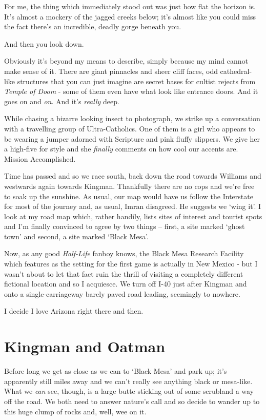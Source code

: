 \documentclass[a5paper,10pt,titlepage,draft]{book}
\begin{document}
For me, the thing which immediately stood out was just how flat the horizon is.  It's almost a mockery of the jagged creeks below; it's almost like you could miss the fact there's an incredible, deadly gorge beneath you.

And then you look down.

Obviously it's beyond my means to describe, simply because my mind cannot make sense of it.  There are giant pinnacles and sheer cliff faces, odd cathedral-like structures that you can just imagine are secret bases for cultist rejects from \emph{Temple of Doom} - some of them even have what look like entrance doors.  And it goes on and \emph{on}.  And it's \emph{really} deep.

While chasing a bizarre looking insect to photograph, we strike up a conversation with a travelling group of Ultra-Catholics.  One of them is a girl who appears to be wearing a jumper adorned with Scripture and pink fluffy slippers.  We give her a high-five for style and she \emph{finally} comments on how cool our accents are.  Mission Accomplished.

Time has passed and so we race south, back down the road towards Williams and westwards again towards Kingman.  Thankfully there are no cops and we're free to soak up the sunshine.  As usual, our map would have us follow the Interstate for most of the journey and, as usual, Imran disagreed.  He suggests we `wing it'.  I look at my road map which, rather handily, lists sites of interest and tourist spots and I'm finally convinced to agree by two things -- first, a site marked `ghost town' and second, a site marked `Black Mesa'.

Now, as any good \emph{Half-Life} fanboy knows, the Black Mesa Research Facility which features as the setting for the first game is actually in New Mexico - but I wasn't about to let that fact ruin the thrill of visiting a completely different fictional location and so I acquiesce.  We turn off I-40 just after Kingman and onto a single-carriageway barely paved road leading, seemingly to nowhere.

I decide I love Arizona right there and then.

\section*{Kingman and Oatman}

Before long we get as close as we can to `Black Mesa' and park up; it's apparently still miles away and we can't really see anything black or mesa-like.  What we \emph{can} see, though, is a large butte sticking out of some scrubland a way off the road.  We both need to answer nature's call and so decide to wander up to this huge clump of rocks and, well, wee on it.
\end{document}
